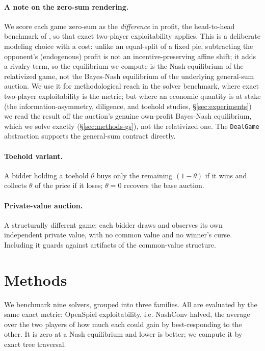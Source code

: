\documentclass[11pt,a4paper]{article}
\begin{document}
\paragraph{A note on the zero-sum rendering.} We score each game zero-sum as the
\emph{difference} in profit, the head-to-head benchmark of \citet{rudolph2026}, so
that exact two-player exploitability applies. This is a deliberate modeling choice
with a cost: unlike an equal-split of a fixed pie, subtracting the opponent's
(endogenous) profit is not an incentive-preserving affine shift; it adds a rivalry
term, so the equilibrium we compute is the Nash equilibrium of the relativized game,
not the Bayes-Nash equilibrium of the underlying general-sum auction. We use it for
methodological reach in the solver benchmark, where exact two-player exploitability is
the metric; but where an economic quantity is at stake (the information-asymmetry,
diligence, and toehold studies, \S\ref{sec:experiments}) we read the result off the
auction's genuine own-profit Bayes-Nash equilibrium, which we solve exactly
(\S\ref{sec:methods-gs}), not the relativized one. The \texttt{DealGame} abstraction
supports the general-sum contract directly.

\paragraph{Toehold variant.} A bidder holding a toehold $\theta$ buys only the
remaining $(1-\theta)$ if it wins and collects $\theta$ of the price if it loses;
$\theta=0$ recovers the base auction.

\paragraph{Private-value auction.} A structurally different game: each bidder draws
and observes its own independent private value, with no common value and no winner's
curse. Including it guards against artifacts of the common-value structure.

\section{Methods}

We benchmark nine solvers, grouped into three families. All are evaluated by the
same exact metric: OpenSpiel exploitability, i.e. NashConv halved, the average over
the two players of how much each could gain by best-responding to the other. It is
zero at a Nash equilibrium and lower is better; we compute it by exact tree
traversal.
\end{document}
